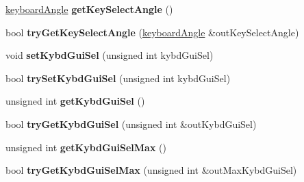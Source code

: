 \begin{DoxyCompactItemize}
\item 
\hypertarget{class_shared_command_data_a6e58959cdb670bc3c128f33614aa4e13}{\hyperlink{structkeyboard_angle}{keyboard\+Angle} {\bfseries get\+Key\+Select\+Angle} ()}\label{class_shared_command_data_a6e58959cdb670bc3c128f33614aa4e13}

\item 
\hypertarget{class_shared_command_data_a58cddf81a5c4196ae2dd807fe885a185}{bool {\bfseries try\+Get\+Key\+Select\+Angle} (\hyperlink{structkeyboard_angle}{keyboard\+Angle} \&out\+Key\+Select\+Angle)}\label{class_shared_command_data_a58cddf81a5c4196ae2dd807fe885a185}

\item 
\hypertarget{class_shared_command_data_a2fd88e2e529018f7637cce9c34ddd5d4}{void {\bfseries set\+Kybd\+Gui\+Sel} (unsigned int kybd\+Gui\+Sel)}\label{class_shared_command_data_a2fd88e2e529018f7637cce9c34ddd5d4}

\item 
\hypertarget{class_shared_command_data_a0c56c506441bbe3c468b780e7eeea2fd}{bool {\bfseries try\+Set\+Kybd\+Gui\+Sel} (unsigned int kybd\+Gui\+Sel)}\label{class_shared_command_data_a0c56c506441bbe3c468b780e7eeea2fd}

\item 
\hypertarget{class_shared_command_data_a493b15fec122cc58bafc4b2d18847810}{unsigned int {\bfseries get\+Kybd\+Gui\+Sel} ()}\label{class_shared_command_data_a493b15fec122cc58bafc4b2d18847810}

\item 
\hypertarget{class_shared_command_data_ab5ce666134231b030e5d1b236c3975da}{bool {\bfseries try\+Get\+Kybd\+Gui\+Sel} (unsigned int \&out\+Kybd\+Gui\+Sel)}\label{class_shared_command_data_ab5ce666134231b030e5d1b236c3975da}

\item 
\hypertarget{class_shared_command_data_a790f23b0e6361c5f01e49e58088a8d96}{unsigned int {\bfseries get\+Kybd\+Gui\+Sel\+Max} ()}\label{class_shared_command_data_a790f23b0e6361c5f01e49e58088a8d96}

\item 
\hypertarget{class_shared_command_data_ab910eeef3ff229c469863a81fa8a0d08}{bool {\bfseries try\+Get\+Kybd\+Gui\+Sel\+Max} (unsigned int \&out\+Max\+Kybd\+Gui\+Sel)}\label{class_shared_command_data_ab910eeef3ff229c469863a81fa8a0d08}


\end{DoxyCompactItemize}
